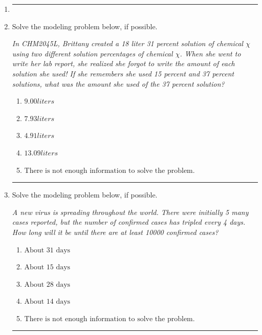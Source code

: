 \documentclass[14pt]{extbook}
\newcommand{\litem}[1]{\item#1\hspace*{-1cm}\rule{\textwidth}{0.4pt}}
\begin{document}
\begin{enumerate}
{\begin{enumerate}[label=\Alph*.]
\end{enumerate} }
\litem{
\begin{enumerate}[label=\Alph*.]

\end{enumerate} }
\litem{
Solve the modeling problem below, if possible.
\begin{center}
    \textit{ In CHM2045L, Brittany created a 18 liter 31 percent solution of chemical $\chi$ using two different solution percentages of chemical $\chi$. When she went to write her lab report, she realized she forgot to write the amount of each solution she used! If she remembers she used 15 percent and 37 percent solutions, what was the amount she used of the 37 percent solution? }
\end{center}
\begin{enumerate}[label=\Alph*.]
\item \( 9.00 liters \)
\item \( 7.93 liters \)
\item \( 4.91 liters \)
\item \( 13.09 liters \)
\item \( \text{There is not enough information to solve the problem.} \)

\end{enumerate} }
\litem{
Solve the modeling problem below, if possible.
\begin{center}
    \textit{ A new virus is spreading throughout the world. There were initially 5 many cases reported, but the number of confirmed cases has tripled every 4 days. How long will it be until there are at least 10000 confirmed cases? }
\end{center}
\begin{enumerate}[label=\Alph*.]
\item \( \text{About } 31 \text{ days} \)
\item \( \text{About } 15 \text{ days} \)
\item \( \text{About } 28 \text{ days} \)
\item \( \text{About } 14 \text{ days} \)
\item \( \text{There is not enough information to solve the problem.} \)


\end{enumerate}}
\end{enumerate}
\end{document}
